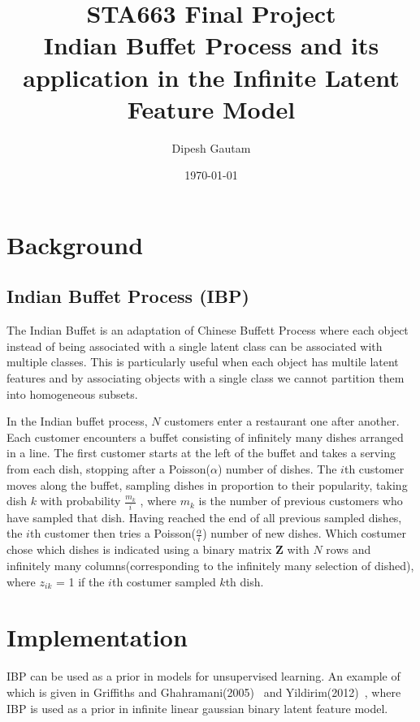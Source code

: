 \documentclass{article}
\begin{document}
\title{STA663 Final Project \\ Indian Buffet Process and its application in the Infinite Latent Feature Model}
\author{Dipesh Gautam}
\date{\today}
\maketitle



\section{Background}
\subsection{Indian Buffet Process (IBP)}
The Indian Buffet is an adaptation of Chinese Buffett Process where each object instead of being associated with a single latent class can  be associated with multiple classes. This is particularly useful when each object has multile latent features and by associating objects with a single class we cannot partition them into homogeneous subsets.

In the Indian buffet process, $N$ customers enter a restaurant one after another. Each customer encounters a buffet 
consisting of infinitely many dishes arranged in a line. The first customer starts at the left of the buffet and 
takes a serving from each dish, stopping after a Poisson($\alpha$) number of dishes. The $i$th customer moves along the buffet, 
sampling dishes in proportion to their popularity, taking dish $k$ with probability $\frac{m_k}{i}$ , where $m_k$ is the number of 
previous customers who have sampled that dish. Having reached the end of all previous sampled dishes, the $i$th customer 
then tries a Poisson($\frac{\alpha}{i}$) number of new dishes. Which costumer chose which dishes is indicated using a binary matrix \textbf{Z} with $N$ rows and infinitely many columns(corresponding to the infinitely many selection of dished), where $z_{ik}$ = 1 if the $i$th costumer sampled $k$th dish.


\section{Implementation}
IBP can be used as a prior in models for unsupervised learning. An example of which is given in Griffiths and Ghahramani(2005)~\cite{griffiths} and Yildirim(2012)~\cite{yildirim}, where IBP is used as a prior in infinite linear gaussian binary latent feature model.
\end{document}
